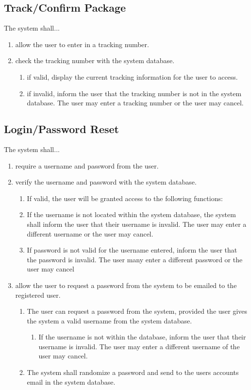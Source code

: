 \documentclass{scrreprt}
\begin{document}
\subsection{Track/Confirm Package}

The system shall...

\begin{enumerate}
\item allow the user to enter in a tracking number.
\item check the tracking number with the system database.
\begin{enumerate}
\item if valid, display the current tracking information for the user to
access.
\item if invalid, inform the user that the tracking number is not in the system
database. The user may enter a tracking number or the user may cancel. 
\end{enumerate}
\end{enumerate}

\subsection{Login/Password Reset}

The system shall...

\begin{enumerate}
\item require a username and password from the user.
\item verify the username and password with the system database.
\begin{enumerate}
\item If valid, the user will be granted access to the following functions:
\item If the username is not located within the system database, the system
shall inform the user that their username is invalid. The user may enter a
different username or the user may cancel.
\item If password is not valid for the username entered, inform the user that
the password is invalid. The user many enter a different password or the user
may cancel 
\end{enumerate}
\item allow the user to request a password from the system to be emailed to the
registered user.
\begin{enumerate}
\item The user can request a password from the system, provided the user gives
the system a valid username from the system database.
\begin{enumerate}
\item If the username is not within the database, inform the user that their
username is invalid. The user may enter a different username of the user may
cancel.
\end{enumerate}
\item The system shall randomize a password and send to the users accounts
email in the system database.
\end{enumerate}
\end{enumerate}
\end{document}

